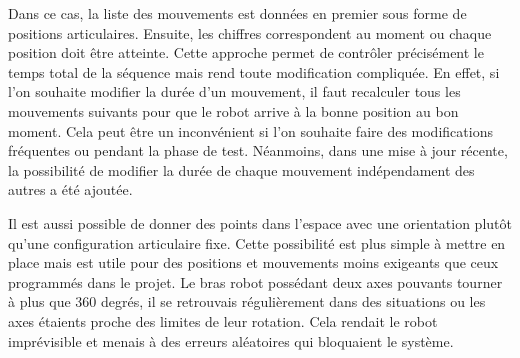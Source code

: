 Dans ce cas, la liste des mouvements est données en premier sous forme de positions articulaires. Ensuite, les chiffres correspondent au moment ou chaque position doit être atteinte. Cette approche permet de contrôler précisément le temps total de la séquence mais rend toute modification compliquée. En effet, si l'on souhaite modifier la durée d'un mouvement, il faut recalculer tous les mouvements suivants pour que le robot arrive à la bonne position au bon moment. Cela peut être un inconvénient si l'on souhaite faire des modifications fréquentes ou pendant la phase de test. Néanmoins, dans une mise à jour récente, la possibilité de modifier la durée de chaque mouvement indépendament des autres a été ajoutée.

Il est aussi possible de donner des points dans l'espace avec une orientation plutôt qu'une configuration articulaire fixe. Cette possibilité est plus simple à mettre en place mais est utile pour des positions et mouvements moins exigeants que ceux programmés dans le projet. Le bras robot possédant deux axes pouvants tourner à plus que 360 degrés, il se retrouvais régulièrement dans des situations ou les axes étaients proche des limites de leur rotation. Cela rendait le robot imprévisible et menais à des erreurs aléatoires qui bloquaient le système.

